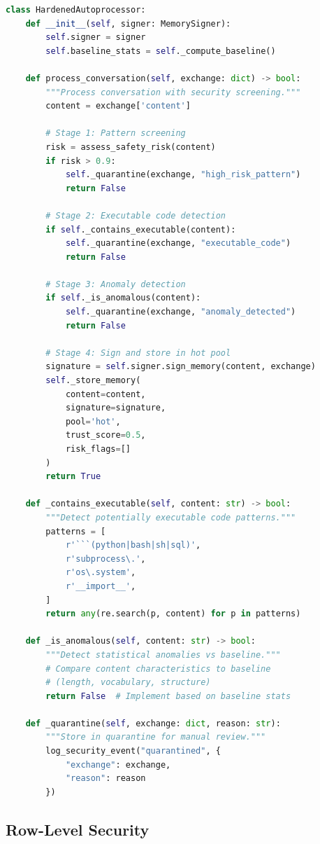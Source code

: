 \begin{lstlisting}[language=Python,caption={Hardened Autoprocessor}]
class HardenedAutoprocessor:
    def __init__(self, signer: MemorySigner):
        self.signer = signer
        self.baseline_stats = self._compute_baseline()

    def process_conversation(self, exchange: dict) -> bool:
        """Process conversation with security screening."""
        content = exchange['content']

        # Stage 1: Pattern screening
        risk = assess_safety_risk(content)
        if risk > 0.9:
            self._quarantine(exchange, "high_risk_pattern")
            return False

        # Stage 2: Executable code detection
        if self._contains_executable(content):
            self._quarantine(exchange, "executable_code")
            return False

        # Stage 3: Anomaly detection
        if self._is_anomalous(content):
            self._quarantine(exchange, "anomaly_detected")
            return False

        # Stage 4: Sign and store in hot pool
        signature = self.signer.sign_memory(content, exchange)
        self._store_memory(
            content=content,
            signature=signature,
            pool='hot',
            trust_score=0.5,
            risk_flags=[]
        )
        return True

    def _contains_executable(self, content: str) -> bool:
        """Detect potentially executable code patterns."""
        patterns = [
            r'```(python|bash|sh|sql)',
            r'subprocess\.',
            r'os\.system',
            r'__import__',
        ]
        return any(re.search(p, content) for p in patterns)

    def _is_anomalous(self, content: str) -> bool:
        """Detect statistical anomalies vs baseline."""
        # Compare content characteristics to baseline
        # (length, vocabulary, structure)
        return False  # Implement based on baseline stats

    def _quarantine(self, exchange: dict, reason: str):
        """Store in quarantine for manual review."""
        log_security_event("quarantined", {
            "exchange": exchange,
            "reason": reason
        })
\end{lstlisting}

\subsection{Row-Level Security}

